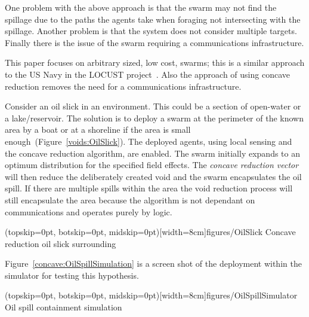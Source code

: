 \documentclass{ieeeaccess}
\begin{document}
One problem with the above approach is that the swarm may not find the spillage due to the paths the agents take when foraging not intersecting with the spillage. Another problem is that the system does not consider multiple targets. Finally there is the issue of the swarm requiring a communications infrastructure. 

This paper focuses on arbitrary sized, low cost, swarms; this is a similar approach to the US Navy in the LOCUST project~\cite{MW:15, DS:15}. Also the approach of using concave reduction removes the need for a communications infrastructure. 

Consider an oil slick in an environment. This could be a section of open-water or a lake/reservoir. The solution is to deploy a swarm at the perimeter of the known area by a boat or at a shoreline if the area is small enough~(Figure~\ref{voids:OilSlick}). The deployed agents, using local sensing and the concave reduction algorithm, are enabled. The swarm initially expands to an optimum distribution for the specified field effects. The \textit{concave reduction vector} will then reduce the deliberately created void and the swarm encapsulates the oil spill. If there are multiple spills within the area the void reduction process will still encapsulate the area because the algorithm is not dependant on communications and operates purely by logic.  

\Figure[t!](topskip=0pt, botskip=0pt, midskip=0pt)[width=8cm]{figures/OilSlick}
{Concave reduction oil slick surrounding\label{voids:OilSlick}}


Figure~\ref{concave:OilSpillSimulation} is a screen shot of the deployment within the simulator for testing this hypothesis. 

\Figure[t!](topskip=0pt, botskip=0pt, midskip=0pt)[width=8cm]{figures/OilSpillSimulator}
{Oil spill containment simulation\label{concave:OilSpillSimulation}}

\end{document}
